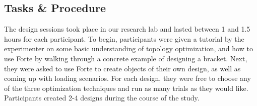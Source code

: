 
\subsection{Tasks \& Procedure}
The design sessions took place in our research lab and lasted between 1 and 1.5 hours for each participant. To begin, participants were given a tutorial by the experimenter on some basic understanding of topology optimization, and how to use Forte by walking through a concrete example of designing a bracket. Next, they were asked to use Forte to create objects of their own design, as well as coming up with loading scenarios. For each design, they were free to choose any of the three optimization techniques and run as many trials as they would like. Participants created 2-4 designs during the course of the study.

